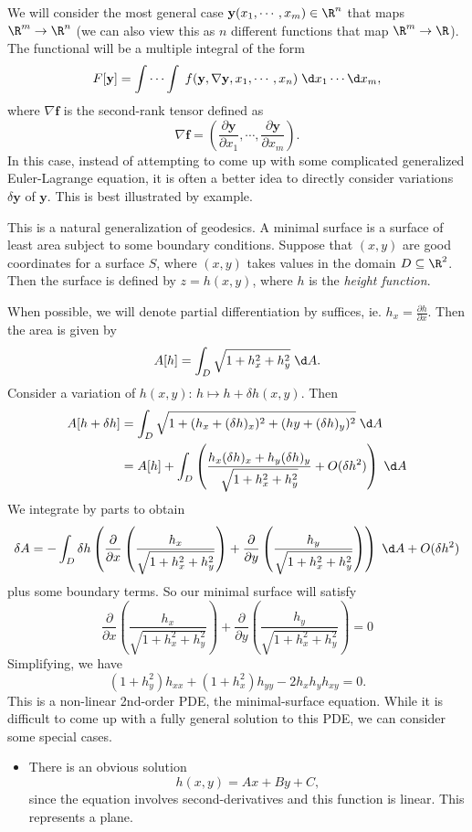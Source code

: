 \documentclass[a4paper]{article}
\begin{document}
We will consider the most general case $\mathbf{y}(x_1, \cdots, x_m) \in \R^n$ that maps $\R^m \to \R^n$ (we can also view this as $n$ different functions that map $\R^m \to \R$). The functional will be a multiple integral of the form
\[
  F[\mathbf{y}] = \int\cdots \int \; f(\mathbf{y}, \nabla \mathbf{y}, x_1, \cdots, x_n)\;\d x_1\cdots \d x_m,
\]
where $\nabla \mathbf{f}$ is the second-rank tensor defined as
\[
  \nabla \mathbf{f} = \left(\frac{\partial \mathbf{y}}{\partial x_1}, \cdots, \frac{\partial \mathbf{y}}{\partial x_m}\right).
\]
In this case, instead of attempting to come up with some complicated generalized Euler-Lagrange equation, it is often a better idea to directly consider variations $\delta \mathbf{y}$ of $\mathbf{y}$. This is best illustrated by example.

\begin{eg}
  This is a natural generalization of geodesics. A minimal surface is a surface of least area subject to some boundary conditions. Suppose that $(x, y)$ are good coordinates for a surface $S$, where $(x, y)$ takes values in the domain $D \subseteq \R^2$. Then the surface is defined by $z = h(x, y)$, where $h$ is the \emph{height function}.

  When possible, we will denote partial differentiation by suffices, ie. $h_x = \frac{\partial h}{\partial x}$. Then the area is given by
  \[
    A[h] = \int_D \sqrt{1 + h_x^2 + h_y^2}\;\d A.
  \]
  Consider a variation of $h(x, y)$: $h\mapsto h + \delta h(x, y)$. Then
  \begin{align*}
    A[h + \delta h] &= \int_D \sqrt{1 + (h_x + (\delta h)_x)^2 + (hy + (\delta h)_y)^2}\;\d A\\
    &= A[h] + \int_D \left(\frac{h_x (\delta h)_x + h_y (\delta h)_y}{\sqrt{1 + h_x^2 + h_y^2}} + O(\delta h^2)\right)\;\d A
  \end{align*}
  We integrate by parts to obtain
  \[
    \delta A = -\int_D \delta h\left(\frac{\partial}{\partial x} \left(\frac{h_x}{\sqrt{1 + h_x^2 + h_y^2}}\right) + \frac{\partial}{\partial y} \left(\frac{h_y}{\sqrt{1 + h_x^2 + h_y^2}}\right)\right)\;\d A + O(\delta h^2)
  \]
  plus some boundary terms. So our minimal surface will satisfy
  \[
    \frac{\partial}{\partial x} \left(\frac{h_x}{\sqrt{1 + h_x^2 + h_y^2}}\right) + \frac{\partial}{\partial y} \left(\frac{h_y}{\sqrt{1 + h_x^2 + h_y^2}}\right) = 0
  \]
  Simplifying, we have
  \[
    (1 + h_y^2)h_{xx} + (1 + h_x^2) h_{yy} - 2h_xh_y h_{xy} = 0.
  \]
  This is a non-linear 2nd-order PDE, the minimal-surface equation. While it is difficult to come up with a fully general solution to this PDE, we can consider some special cases.
  \begin{itemize}
    \item There is an obvious solution
      \[
        h(x, y) = Ax + By + C,
      \]
      since the equation involves second-derivatives and this function is linear. This represents a plane.


\end{itemize}
\end{eg}
\end{document}
